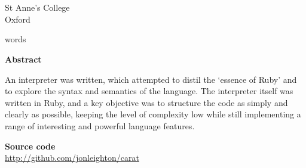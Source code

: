 \begin{titlepage}
\begin{center}

  {\GaramondClassicoSC {\huge \textbf{\gettitle}}} \\
  \bigskip
  {\Large
    \textbf{\getauthor} \\
    St Anne's College \\
    Oxford}\\
  \bigskip
  {\large \getdate}
  
	 words
	
	\vspace{1.5cm}
	
	{\Large \textbf{Abstract}}\\
  \parbox{10cm}{
  \bigskip
  An interpreter was written, which attempted to distil the `essence of Ruby' and
  to explore the syntax and semantics of the language. The interpreter itself was written in Ruby,
  and a key objective was to structure the code as simply and clearly as possible, keeping the
  level of complexity low while still implementing a range of interesting and powerful language
  features.
  }
	
	\vspace{1cm}
	
	\textbf{Source code} \\
	\url{http://github.com/jonleighton/carat}

\end{center}
\end{titlepage}
